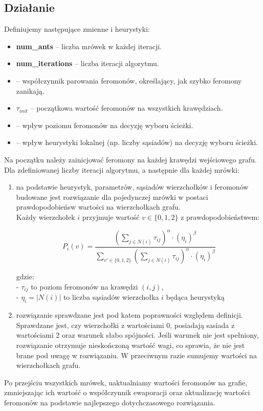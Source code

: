 \subsection{Działanie}
Definiujemy następujące zmienne i heurystyki:
\begin{itemize}
    \item \textbf{num\_ants} – liczba mrówek w każdej iteracji.
    \item \textbf{num\_iterations} – liczba iteracji algorytmu.
    \item \textbf{\rho} – współczynnik parowania feromonów, określający, jak szybko feromony zanikają.
    \item $\tau_{init}$ – początkowa wartość feromonów na wszystkich krawędziach.
    \item \textbf{\alpha} – wpływ poziomu feromonów na decyzję wyboru ścieżki.
    \item \textbf{\beta} – wpływ heurystyki lokalnej (np. liczby sąsiadów) na decyzję wyboru ścieżki.
\end{itemize}
Na początku należy zainicjować feromony na każdej krawędzi wejściowego grafu.\\
Dla zdefiniowanej liczby iteracji algorytmu, a następnie dla każdej mrówki:
\begin{enumerate}
    \item na podstawie heurystyk, parametrów, sąsiadów wierzchołków i feromonów budowane jest rozwiązanie dla pojedynczej mrówki w postaci prawdopodobieńsw wartości na wierzchołkach grafu.\\
    Każdy wierzchołek \( i \) przyjmuje wartość \( v \in \{0,1,2\} \) z prawdopodobieństwem:

\[
P_i(v) = \frac{ \left( \sum\limits_{j \in N(i)} \tau_{ij} \right)^\alpha \cdot (\eta_i)^\beta }
{\sum\limits_{v' \in \{0,1,2\}} \left( \sum\limits_{j \in N(i)} \tau_{ij} \right)^\alpha \cdot (\eta_i)^\beta}
\]

gdzie:\\
- \( \tau_{ij} \) to poziom feromonów na krawędzi \( (i,j) \),\\
- \( \eta_i = |N(i)| \) to liczba sąsiadów wierzchołka \( i \) będąca heurystyką

    \item rozwiązanie sprawdzane jest pod katem poprawności względem definicji. Sprawdzane jest, czy wierzchołki z wartościami 0, posiadają sasiada z wartościami 2 oraz warunek słabo spójności. Jeśli warunek nie jest spełniony, rozwiązanie otrzymuje nieskończoną wartość wagi, co sprawia, że nie jest brane pod uwagę w rozwiązaniu. W przeciwnym razie sumujemy wartości na wierzchołkach grafu.
\end{enumerate}
Po przejściu wszystkich mrówek, uaktualniamy wartości feromonów na grafie, zmniejszając ich wartość o współczynnik ewaporacji oraz aktualizację wartości feromonów na podstawie najlepszego dotychczasowego rozwiązania.

